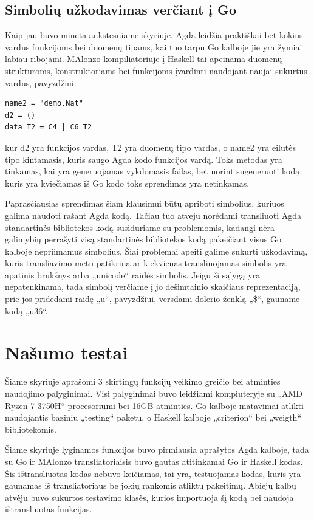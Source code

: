 \documentclass{VUMIFPSbakalaurinis}
\begin{document}
\subsection{Simbolių užkodavimas verčiant į Go}
Kaip jau buvo minėta ankstesniame skyriuje, Agda leidžia praktiškai bet kokius vardus funkcijoms bei duomenų tipams, kai tuo tarpu Go kalboje jie yra žymiai labiau ribojami. MAlonzo kompiliatoriuje į Haskell tai apeinama duomenų struktūroms, konstruktoriams bei funkcijoms įvardinti naudojant naujai sukurtus vardus, pavyzdžiui:
\begin{lstlisting}
name2 = "demo.Nat"
d2 = ()
data T2 = C4 | C6 T2
\end{lstlisting}
kur d2 yra funkcijos vardas, T2 yra duomenų tipo vardas, o name2 yra eilutės tipo kintamasis, kuris saugo Agda kodo funkcijos vardą. Toks metodas yra tinkamas, kai yra generuojamas vykdomasis failas, bet norint sugeneruoti kodą, kuris yra kviečiamas iš Go kodo toks sprendimas yra netinkamas. \par Paprasčiausias sprendimas šiam klausimui būtų apriboti simbolius, kuriuos galima naudoti rašant Agda kodą. Tačiau tuo atveju norėdami transliuoti Agda standartinės bibliotekos kodą susiduriame su problemomis, kadangi nėra galimybių perrašyti visą standartinės bibliotekos kodą pakeičiant visus Go kalboje nepriimamus simbolius. Šiai problemai apeiti galime sukurti užkodavimą, kuris transliavimo metu patikrina ar kiekvienas transliuojamas simbolis yra apatinis brūkšnys arba „unicode“ raidės simbolis. Jeigu ši sąlygą yra nepatenkinama, tada simbolį verčiame į jo dešimtainio skaičiaus reprezentaciją, prie jos pridedami raidę „u“, pavyzdžiui, versdami dolerio ženklą „\$“, gauname kodą „u36“.
\section{Našumo testai} \label{nasumas}
Šiame skyriuje aprašomi 3 skirtingų funkcijų veikimo greičio bei atminties naudojimo palyginimai. Visi palyginimai buvo leidžiami kompiuteryje su  „AMD Ryzen 7 3750H“ procesoriumi bei 16GB atminties. Go kalboje matavimai atlikti naudojantis baziniu „testing“ paketu, o Haskell kalboje „criterion“ bei „weigth“ bibliotekomis. 
\par Šiame skyriuje lyginamos funkcijos buvo pirmiausia aprašytos Agda kalboje, tada su Go ir MAlonzo transliatoriaisis buvo gautas atitinkamai Go ir Haskell kodas. Šis ištransliuotas kodas nebuvo keičiamas, tai yra, testuojamas kodas, kuris yra gaunamas iš transliatoriaus be jokių rankomis atliktų pakeitimų. Abiejų kalbų atvėju buvo sukurtos testavimo klasės, kurios importuoja šį kodą bei naudoja ištransliuotas funkcijas.
\end{document}
